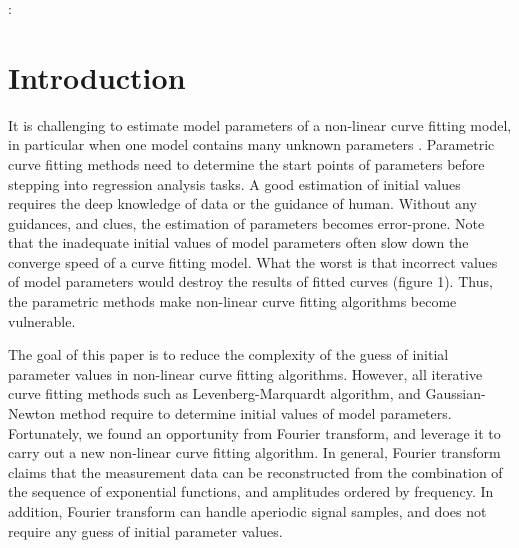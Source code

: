 \documentclass{sig-alternate}
\begin{document}

:
\section{Introduction}
It is challenging to estimate model parameters of a non-linear curve fitting model, in particular when one model contains many unknown parameters \cite{Achim:Curve, nonlinear:Mark}. Parametric curve fitting methods need to determine the start points of parameters before stepping into regression analysis tasks. A good estimation of initial values requires the deep knowledge of data or the guidance of human. Without any guidances, and clues, the estimation of parameters becomes error-prone. Note that the inadequate initial values of model parameters often slow down the converge speed of a curve fitting model. What the worst is that incorrect values of model parameters would destroy the results of fitted curves (figure 1). Thus, the parametric methods make non-linear curve fitting algorithms become vulnerable. 

The goal of this paper is to reduce the complexity of the guess of initial parameter values in non-linear curve fitting algorithms. However, all iterative curve fitting methods such as Levenberg-Marquardt algorithm\cite{Marquardt:1963}, and Gaussian-Newton method require to determine initial values of model parameters. Fortunately, we found an opportunity from Fourier transform, and leverage it to carry out a new non-linear curve fitting algorithm. In general, Fourier transform claims that the measurement data can be reconstructed from the combination of the sequence of exponential functions, and amplitudes ordered by frequency. In addition, Fourier transform can handle aperiodic signal samples, and does not require any guess of initial parameter values. 
\end{document}

